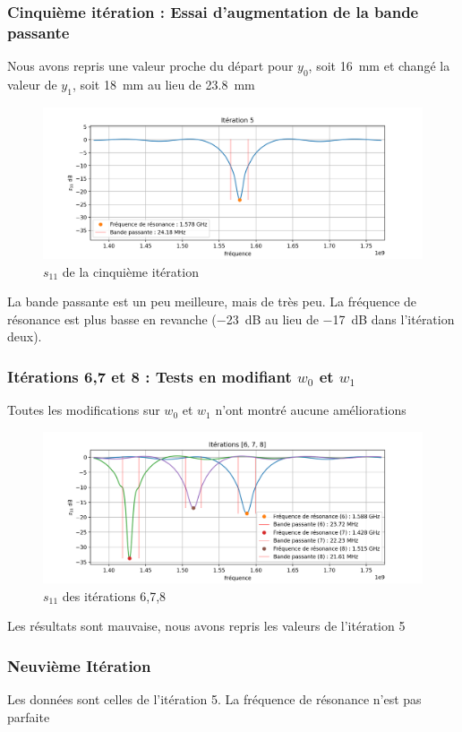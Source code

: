 \documentclass[Deriaz_Traiber_Labo02.tex]{subfiles}
\begin{document}
\subsubsection{Cinquième itération : Essai d'augmentation de la bande passante}
Nous avons repris une valeur proche du départ pour $y_0$, soit \SI{16}{\milli\meter} et changé la valeur de $y_1$, soit \SI{18}{\milli\meter} au lieu de \SI{23.8}{\milli\meter}
\begin{figure}[H]
\centering
\includegraphics[width=15cm]{../Calculs/run_id_fr4_5.png}
\caption[caption]{$s_{11}$ de la cinquième itération}
\end{figure}
La bande passante est un peu meilleure, mais de très peu. La fréquence de résonance est plus basse en revanche (\SI{-23}{\deci\bel} au lieu de \SI{-17}{\deci\bel} dans l'itération deux).
\subsubsection{Itérations 6,7 et 8 : Tests en modifiant $w_0$ et $w_1$}
Toutes les modifications sur $w_0$ et $w_1$ n'ont montré aucune améliorations
\begin{figure}[H]
\centering
\includegraphics[width=15cm]{../Calculs/run_id_fr4_678.png}
\caption[caption]{$s_{11}$ des itérations 6,7,8}
\end{figure}
Les résultats sont mauvaise, nous avons repris les valeurs de l'itération 5
\subsubsection{Neuvième Itération}
Les données sont celles de l'itération 5. La fréquence de résonance n'est pas parfaite
\end{document}
